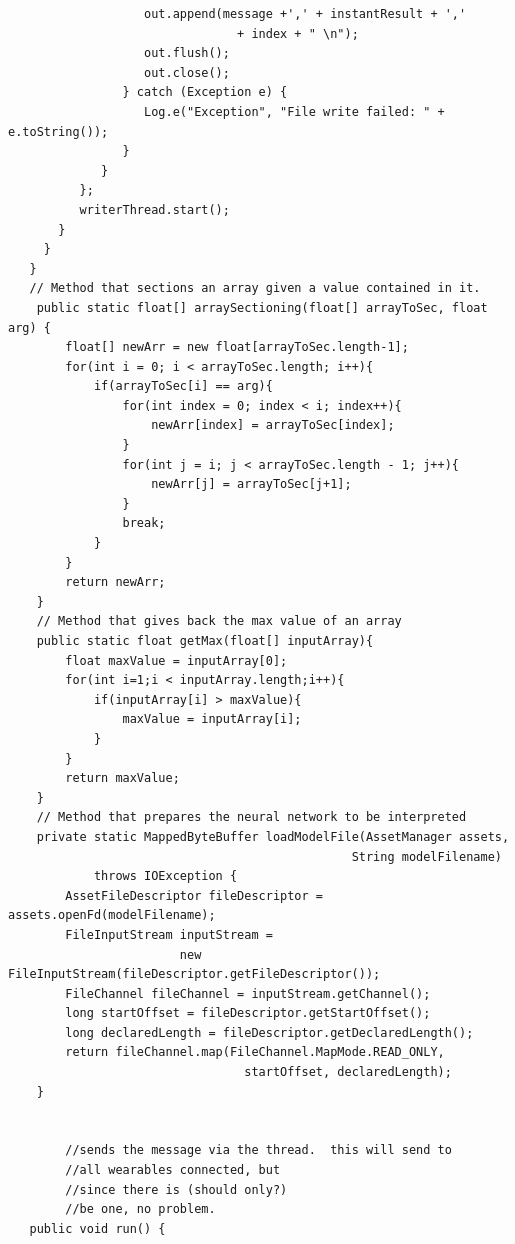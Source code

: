 \documentclass[12pt]{book}
\numberwithin{equation}{section}
\begin{document}
\begin{appendices}
\begin{verbatim}
                   out.append(message +',' + instantResult + ',' 
                   				+ index + " \n");
                   out.flush();
                   out.close();
                } catch (Exception e) {
                   Log.e("Exception", "File write failed: " + e.toString());
                }
             }
          };
          writerThread.start();
       }
     }
   }
   // Method that sections an array given a value contained in it.
    public static float[] arraySectioning(float[] arrayToSec, float arg) {
        float[] newArr = new float[arrayToSec.length-1];
        for(int i = 0; i < arrayToSec.length; i++){
            if(arrayToSec[i] == arg){
                for(int index = 0; index < i; index++){
                    newArr[index] = arrayToSec[index];
                }
                for(int j = i; j < arrayToSec.length - 1; j++){
                    newArr[j] = arrayToSec[j+1];
                }
                break;
            }
        }
        return newArr;
    }
    // Method that gives back the max value of an array
    public static float getMax(float[] inputArray){
        float maxValue = inputArray[0];
        for(int i=1;i < inputArray.length;i++){
            if(inputArray[i] > maxValue){
                maxValue = inputArray[i];
            }
        }
        return maxValue;
    }
	// Method that prepares the neural network to be interpreted
    private static MappedByteBuffer loadModelFile(AssetManager assets, 
    											String modelFilename)
            throws IOException {
        AssetFileDescriptor fileDescriptor = assets.openFd(modelFilename);
        FileInputStream inputStream = 
        				new FileInputStream(fileDescriptor.getFileDescriptor());
        FileChannel fileChannel = inputStream.getChannel();
        long startOffset = fileDescriptor.getStartOffset();
        long declaredLength = fileDescriptor.getDeclaredLength();
        return fileChannel.map(FileChannel.MapMode.READ_ONLY,
        						 startOffset, declaredLength);
    }


        //sends the message via the thread.  this will send to 
        //all wearables connected, but
        //since there is (should only?) 
        //be one, no problem.
   public void run() {


\end{verbatim}
\end{appendices}
\end{document}
